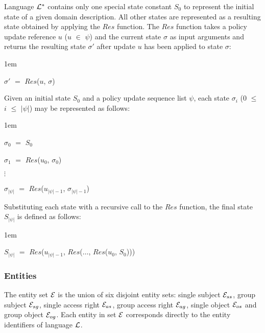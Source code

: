 \documentclass[11pt]{report}
\newenvironment{vquote}
{
  \begin{list}{}{\leftmargin 1em}\item[]
}
{
  \end{list}
}
\begin{document}
        Language ${\cal L}^{*}$ contains only one special state constant
        $S_{0}$ to represent the initial state of a given domain description.
        All other states are represented as a resulting state obtained by
        applying the $Res$ function. The $Res$ function takes a policy update
        reference $u$ ($u$ $\in$ $\psi$) and the current state $\sigma$ as
        input arguments and returns the resulting state $\sigma'$ after
        update $u$ has been applied to state $\sigma$:

        \begin{vquote}
          $\sigma'$ $=$ $Res$($u$, $\sigma$)
        \end{vquote}

        \noindent
        Given an initial state $S_{0}$ and a policy update sequence list
        $\psi$, each state $\sigma_{i}$ ($0$ $\leq$ $i$ $\leq$ $|\psi|$)
        may be represented as follows:

        \begin{vquote}
          $\sigma_{0}$ $=$ $S_{0}$

          $\sigma_{1}$ $=$ $Res$($u_{0}$, $\sigma_{0}$)

          $\vdots$

          $\sigma_{|\psi|}$ $=$
            $Res$($u_{|\psi| - 1}$, $\sigma_{|\psi| - 1}$)
        \end{vquote}

        \noindent
        Substituting each state with a recursive call to the $Res$ function,
        the final state $S_{|\psi|}$ is defined as follows:

        \begin{vquote}
          $S_{|\psi|}$ $=$
            $Res$($u_{|\psi| - 1}$, $Res$($\ldots$, $Res$($u_{0}$, $S_{0}$)))
        \end{vquote}

        \subsubsection{Entities}

          The entity set ${\cal E}$ is the union of six disjoint entity sets:
          single subject ${\cal E}_{ss}$, group subject ${\cal E}_{sg}$,
          single access right ${\cal E}_{as}$, group access right
          ${\cal E}_{ag}$, single object ${\cal E}_{os}$ and group object
          ${\cal E}_{og}$. Each entity in set ${\cal E}$ corresponds directly
          to the entity identifiers of language ${\cal L}$.
\end{document}
